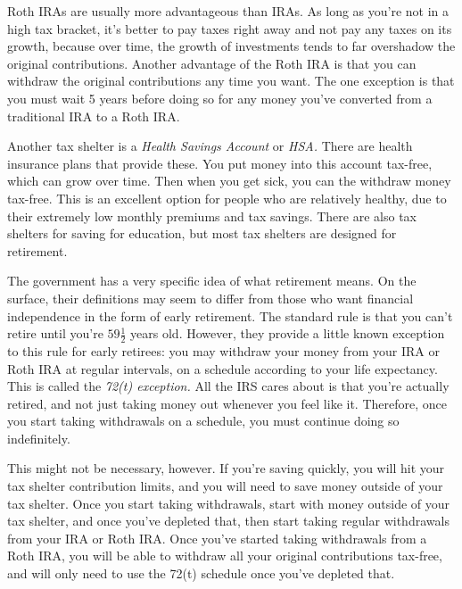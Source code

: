 Roth IRAs are usually more advantageous than IRAs. As long as you're not in a high tax bracket, it's better to pay taxes right away and not pay any taxes on its growth, because over time, the growth of investments tends to far overshadow the original contributions. Another advantage of the Roth IRA is that you can withdraw the original contributions any time you want. The one exception is that you must wait 5 years before doing so for any money you've converted from a traditional IRA to a Roth IRA.

Another tax shelter is a \emph{Health Savings Account} or \emph{HSA.} There are health insurance plans that provide these. You put money into this account tax-free, which can grow over time. Then when you get sick, you can the withdraw money tax-free. This is an excellent option for people who are relatively healthy, due to their extremely low monthly premiums and tax savings. There are also tax shelters for saving for education, but most tax shelters are designed for retirement.

The government has a very specific idea of what retirement means. On the surface, their definitions may seem to differ from those who want financial independence in the form of early retirement. The standard rule is that you can't retire until you're $59 \frac{1}{2}$ years old. However, they provide a little known exception to this rule for early retirees: you may withdraw your money from your IRA or Roth IRA at regular intervals, on a schedule according to your life expectancy. This is called the \emph{72(t) exception.} All the IRS cares about is that you're actually retired, and not just taking money out whenever you feel like it. Therefore, once you start taking withdrawals on a schedule, you must continue doing so indefinitely.

This might not be necessary, however. If you're saving quickly, you will hit your tax shelter contribution limits, and you will need to save money outside of your tax shelter. Once you start taking withdrawals, start with money outside of your tax shelter, and once you've depleted that, then start taking regular withdrawals from your IRA or Roth IRA. Once you've started taking withdrawals from a Roth IRA, you will be able to withdraw all your original contributions tax-free, and will only need to use the 72(t) schedule once you've depleted that.

